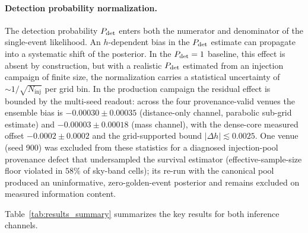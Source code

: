 \paragraph{Detection probability normalization.}
The detection probability $P_\mathrm{det}$ enters both the numerator and
denominator of the single-event likelihood. An $h$-dependent bias in the
$P_\mathrm{det}$ estimate can propagate into a systematic shift of the posterior.
In the $P_\mathrm{det} = 1$ baseline, this effect is absent by construction, but
with a realistic $P_\mathrm{det}$ estimated from an injection campaign of
finite size, the normalization carries a statistical uncertainty of
$\sim 1/\sqrt{N_\mathrm{inj}}$ per grid bin.
In the production campaign the residual effect is bounded by the
multi-seed readout: across the four provenance-valid venues the
ensemble bias is $-0.00030 \pm 0.00035$ (distance-only channel,
parabolic sub-grid estimate) and $-0.00003 \pm 0.00018$ (mass
channel), with the dense-core measured offset $-0.0002 \pm 0.0002$
and the grid-supported bound $|\Delta h| \lesssim 0.0025$. One venue
(seed 900) was excluded from these statistics for a diagnosed
injection-pool provenance defect that undersampled the survival
estimator (effective-sample-size floor violated in $58\%$ of sky-band
cells); its re-run with the canonical pool produced an uninformative,
zero-golden-event posterior and remains excluded on measured
information content.

Table~\ref{tab:results_summary} summarizes the key results for both
inference channels.

